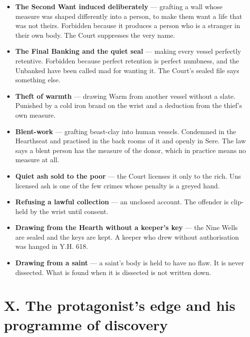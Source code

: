 \documentclass{design/chronicle}
\begin{document}
\begin{itemize}[leftmargin=1.4em,itemsep=1pt,topsep=3pt,parsep=0pt]

\item \textbf{The Second Want induced deliberately} — grafting a wall whose measure was shaped differently into a person, to make them want a life that was not theirs. Forbidden because it produces a person who is a stranger in their own body. The Court suppresses the very name.

\item \textbf{The Final Banking and the quiet seal} — making every vessel perfectly retentive. Forbidden because perfect retention is perfect numbness, and the Unbanked have been called mad for wanting it. The Court’s sealed file says something else.

\item \textbf{Theft of warmth} — drawing Warm from another vessel without a slate. Punished by a cold iron brand on the wrist and a deduction from the thief’s own measure.

\item \textbf{Blent-work} — grafting beast-clay into human vessels. Condemned in the Hearthseat and practised in the back rooms of it and openly in Sere. The law says a blent person has the measure of the donor, which in practice means no measure at all.

\item \textbf{Quiet ash sold to the poor} — the Court licenses it only to the rich. Uns licensed ash is one of the few crimes whose penalty is a greyed hand.

\item \textbf{Refusing a lawful collection} — an unclosed account. The offender is clip-held by the wrist until consent.

\item \textbf{Drawing from the Hearth without a keeper’s key} — the Nine Wells are sealed and the keys are kept. A keeper who drew without authorisation was hanged in Y.H. 618.

\item \textbf{Drawing from a saint} — a saint’s body is held to have no flaw. It is never dissected. What is found when it is dissected is not written down.

\end{itemize}

\section*{X. The protagonist’s edge and his programme of discovery}
\end{document}
